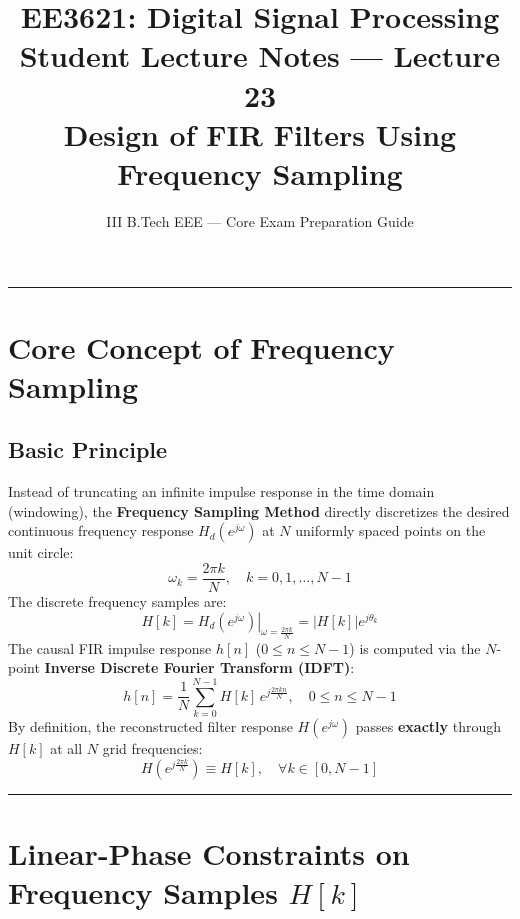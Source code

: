 \documentclass[11pt,a4paper]{article}
\title{\textbf{EE3621: Digital Signal Processing} \\ \Large Student Lecture Notes — Lecture 23 \\ \large Design of FIR Filters Using Frequency Sampling}
\author{III B.Tech EEE — Core Exam Preparation Guide}
\date{}
\begin{document}
\maketitle

\noindent\rule{\textwidth}{0.5pt}

\section{Core Concept of Frequency Sampling}

\subsection{Basic Principle}
Instead of truncating an infinite impulse response in the time domain (windowing), the \textbf{Frequency Sampling Method} directly discretizes the desired continuous frequency response $H_d(e^{j\omega})$ at $N$ uniformly spaced points on the unit circle:
\begin{equation}
\omega_k = \frac{2\pi k}{N}, \quad k = 0, 1, \dots, N-1
\end{equation}
The discrete frequency samples are:
\begin{equation}
H[k] = \left. H_d(e^{j\omega}) \right|_{\omega = \frac{2\pi k}{N}} = |H[k]| e^{j \theta_k}
\end{equation}
The causal FIR impulse response $h[n]$ ($0 \le n \le N-1$) is computed via the $N$-point \textbf{Inverse Discrete Fourier Transform (IDFT)}:
\begin{equation}
h[n] = \frac{1}{N} \sum_{k=0}^{N-1} H[k] \, e^{j \frac{2\pi k n}{N}}, \quad 0 \le n \le N-1
\end{equation}
By definition, the reconstructed filter response $H(e^{j\omega})$ passes \textbf{exactly} through $H[k]$ at all $N$ grid frequencies:
\begin{equation}
H\left(e^{j \frac{2\pi k}{N}}\right) \equiv H[k], \quad \forall k \in [0, N-1]
\end{equation}

\noindent\rule{\textwidth}{0.5pt}

\section{Linear-Phase Constraints on Frequency Samples \texorpdfstring{$H[k]$}{H[k]}}
\end{document}
